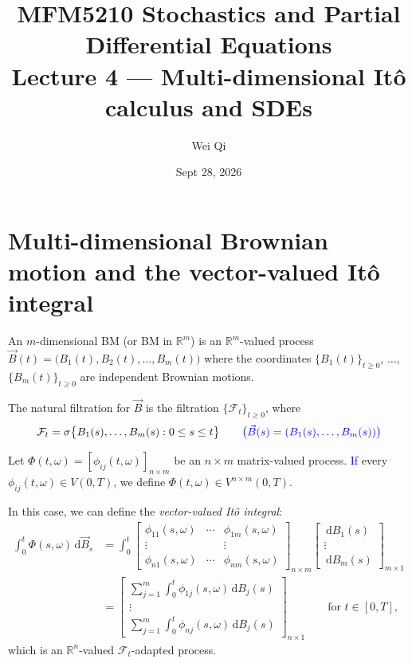 \documentclass[11pt]{article}
\title{\textbf{MFM5210 Stochastics and Partial Differential Equations}\\[4pt]
\large Lecture 4 --- Multi-dimensional It\^o calculus and SDEs}
\author{Wei Qi}
\date{Sept 28, 2026}
\newcommand{\R}{\mathbb{R}}
\newcommand{\F}{\mathcal{F}}
\newcommand{\dd}{\,\mathrm{d}}
\newcommand{\ann}[1]{\textcolor{blue}{#1}}
\theoremstyle{definition}
\theoremstyle{plain}
\begin{document}
\maketitle

\section{Multi-dimensional Brownian motion and the vector-valued It\^o integral}

An $m$-dimensional BM (or BM in $\R^m$) is an $\R^m$-valued process
$\vec B(t)=\bigl(B_1(t),B_2(t),\ldots,B_m(t)\bigr)$ where the coordinates
$\{B_1(t)\}_{t\ge0}$, $\ldots$, $\{B_m(t)\}_{t\ge0}$ are independent Brownian motions.

\medskip
\noindent The natural filtration for $\vec B$ is the filtration $\{\F_t\}_{t\ge0}$, where
\[
  \F_t=\sigma\bigl\{B_1(s),\ldots,B_m(s): 0\le s\le t\bigr\}
  \qquad\ann{\bigl(\vec B(s)=(B_1(s),\ldots,B_m(s))\bigr)}
\]

Let $\Phi(t,\omega)=[\phi_{ij}(t,\omega)]_{n\times m}$ be an $n\times m$
matrix-valued process. \ann{If} every $\phi_{ij}(t,\omega)\in V(0,T)$, we define
$\Phi(t,\omega)\in V^{n\times m}(0,T)$.

\medskip
\noindent In this case, we can define the \emph{vector-valued It\^o integral}:
\begin{align*}
  \int_0^t\Phi(s,\omega)\dd\vec B_s
    &=\int_0^t
      \begin{bmatrix}
        \phi_{11}(s,\omega) & \cdots & \phi_{1m}(s,\omega)\\
        \vdots & & \vdots\\
        \phi_{n1}(s,\omega) & \cdots & \phi_{nm}(s,\omega)
      \end{bmatrix}_{n\times m}
      \begin{bmatrix}
        \dd B_1(s)\\ \vdots\\ \dd B_m(s)
      \end{bmatrix}_{m\times1}\\
    &=\begin{bmatrix}
        \sum_{j=1}^m\int_0^t\phi_{1j}(s,\omega)\dd B_j(s)\\
        \vdots\\
        \sum_{j=1}^m\int_0^t\phi_{nj}(s,\omega)\dd B_j(s)
      \end{bmatrix}_{n\times1}
      \qquad\text{for } t\in[0,T],
\end{align*}
which is an $\R^n$-valued $\F_t$-adapted process.
\end{document}

